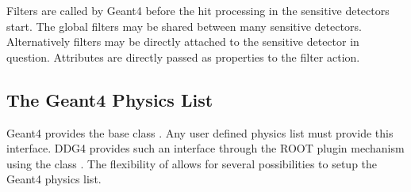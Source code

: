 \documentclass[10pt,a4paper]{article}
\begin{document}
\noindent
Filters are called by Geant4 before the
hit processing in the sensitive detectors start. The global filters
may be shared between many sensitive detectors. Alternatively filters
may be directly attached to the sensitive detector in question.
Attributes are directly passed as properties to the filter action.

\newpage
\subsection{The Geant4 Physics List}
\label{sec:ddg4-implementation-physics-list}
\noindent 
Geant4 provides the base class . Any user defined
physics list must provide this interface. DDG4 provides such an interface
through the ROOT plugin mechanism using the class .
The flexibility of \DDG allows for several possibilities to setup the Geant4
physics list.
\end{document}
